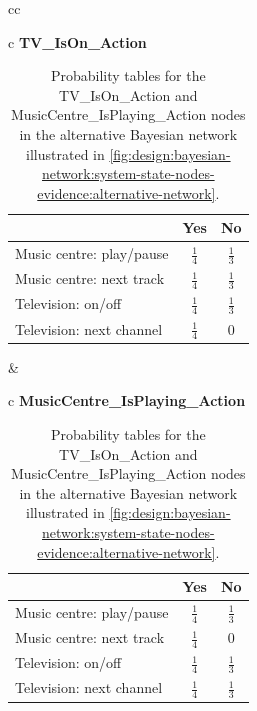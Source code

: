 \begin{table}[h!]
\centering
\caption{Probability tables for the TV\_IsOn\_Action and MusicCentre\_IsPlaying\_Action nodes in the alternative Bayesian network illustrated in \cref{fig:design:bayesian-network:system-state-nodes-evidence:alternative-network}.}
\label{tbl:design:bayesian-network:alternative-system-state}
\begin{tabular}{cc}
\begin{tabular}{c}
\textbf{TV\_IsOn\_Action}   \\
\begin{tabular}{l|cc}
~ & Yes   & No \\ \hline
Music centre: play/pause & $\frac{1}{4}$ & $\frac{1}{3}$ \\
Music centre: next track & $\frac{1}{4}$ & $\frac{1}{3}$ \\
Television: on/off       & $\frac{1}{4}$ & $\frac{1}{3}$ \\
Television: next channel & $\frac{1}{4}$ & 0
\end{tabular}
\end{tabular}
&
\begin{tabular}{c}
\textbf{MusicCentre\_IsPlaying\_Action}   \\
\begin{tabular}{l|cc}
~ & Yes   & No \\ \hline
Music centre: play/pause & $\frac{1}{4}$ & $\frac{1}{3}$ \\
Music centre: next track & $\frac{1}{4}$ & 0 \\
Television: on/off       & $\frac{1}{4}$ & $\frac{1}{3}$ \\
Television: next channel & $\frac{1}{4}$ & $\frac{1}{3}$
\end{tabular}
\end{tabular}
\end{tabular}
\end{table}


